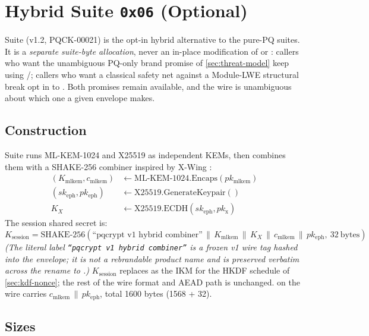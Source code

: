 \section{Hybrid Suite \texttt{0x06} (Optional)}
\label{sec:hybrid}

Suite  (v1.2, PQCK-00021) is the opt-in hybrid alternative to the pure-PQ suites. It is a \emph{separate suite-byte allocation}, never an in-place modification of  or : callers who want the unambiguous PQ-only brand promise of \cref{sec:threat-model} keep using /; callers who want a classical safety net against a Module-LWE structural break opt in to . Both promises remain available, and the wire is unambiguous about which one a given envelope makes.

\subsection{Construction}

Suite  runs ML-KEM-1024 and X25519 \citep{rfc7748} as independent KEMs, then combines them with a SHAKE-256 \citep{fips202} combiner inspired by X-Wing \citep{xwing-draft}:
\begin{align*}
(K_{\mathrm{mlkem}}, c_{\mathrm{mlkem}}) &\leftarrow \mathrm{ML\text{-}KEM\text{-}1024.Encaps}(pk_{\mathrm{mlkem}}) \\
(sk_{\mathrm{eph}}, pk_{\mathrm{eph}}) &\leftarrow \mathrm{X25519.GenerateKeypair}() \\
K_{X} &\leftarrow \mathrm{X25519.ECDH}(sk_{\mathrm{eph}}, pk_{\mathrm{x}})
\end{align*}
The session shared secret is:
$$
K_{\mathrm{session}} = \mathrm{SHAKE\text{-}256}\!\left(\text{``pqcrypt v1 hybrid combiner''} \,\|\, K_{\mathrm{mlkem}} \,\|\, K_{X} \,\|\, c_{\mathrm{mlkem}} \,\|\, pk_{\mathrm{eph}},\ 32\ \mathrm{bytes}\right)
$$
\emph{(The literal label \texttt{``pqcrypt v1 hybrid combiner''} is a frozen v1 wire tag hashed into the envelope; it is not a rebrandable product name and is preserved verbatim across the rename to \pqcrypt{}.)}
$K_{\mathrm{session}}$ replaces  as the IKM for the HKDF schedule of \cref{sec:kdf-nonce}; the rest of the wire format and AEAD path is unchanged.  on the wire carries $c_{\mathrm{mlkem}} \,\|\, pk_{\mathrm{eph}}$, total 1600 bytes (1568 + 32).

\subsection{Sizes}

